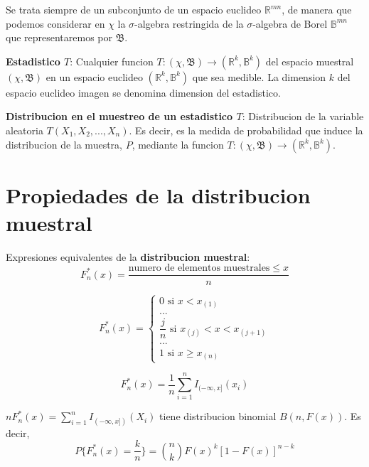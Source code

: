 \documentclass[10pt]{extarticle}
\newcommand{\R}{\mathbb{R}}
\newcommand{\<}{\langle}
\renewcommand{\>}{\rangle}
\theoremstyle{definition}
\begin{document}
Se trata siempre de un subconjunto de un espacio euclideo $\R^{mn}$, de manera que podemos considerar en $\chi$ la $\sigma$-algebra restringida de la $\sigma$-algebra de Borel $\mathbb{B}^{mn}$ que representaremos por $\mathfrak{B}$.

\textbf{Estadistico $T$}: Cualquier funcion $T: (\chi, \mathfrak{B}) \rightarrow (\R^k, \mathbb{B}^k)$ del espacio muestral $(\chi, \mathfrak{B})$ en un espacio euclideo $(\R^k, \mathbb{B}^k)$ que sea medible. La dimension $k$ del espacio euclideo imagen se denomina dimension del estadistico.

\textbf{Distribucion en el muestreo de un estadistico $T$}: Distribucion de la variable aleatoria $T(X_1, X_2,..., X_n)$. Es decir, es la medida de probabilidad que induce la distribucion de la muestra, $P$, mediante la funcion $T: (\chi, \mathfrak{B}) \rightarrow (\R^k, \mathbb{B}^k)$.

\newpage

\section{Propiedades de la distribucion muestral}

Expresiones equivalentes de la \textbf{distribucion muestral}:
\begin{equation*}
  F_n^*(x)=\dfrac{\text{numero de elementos muestrales} \leq x}{n}
\end{equation*}

\begin{equation*}
  F_n^*(x)=
  \begin{cases}
    0 \text{ si } x < x_{(1)}                        \\
    ...                                              \\
    \dfrac{j}{n} \text{ si } x_{(j)} < x < x_{(j+1)} \\
    ...                                              \\
    1 \text{ si } x\geq x_{(n)}
  \end{cases}
\end{equation*}

\begin{equation*}
  F_n^*(x)=\dfrac{1}{n}\sum_{i=1}^n I_{(-\infty,x]}(x_i)
\end{equation*}


$n F_n^*(x)=\sum_{i=1}^n I_{(-\infty,x])}(X_i)$ tiene distribucion binomial $B(n, F(x))$. Es decir,
\begin{equation*}
  P\{ F_n^*(x)=\dfrac{k}{n} \} = {n \choose k}F(x)^k[1-F(x)]^{n-k}
\end{equation*}
\end{document}
